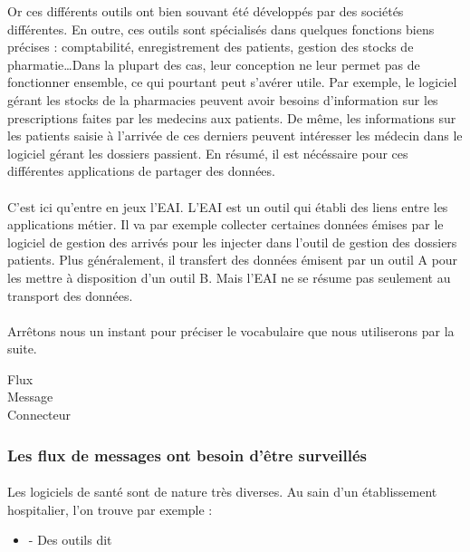 			Or ces différents outils ont bien souvant été développés par des sociétés
			différentes. En outre, ces outils sont spécialisés dans quelques fonctions
			biens précises : comptabilité, enregistrement des patients, gestion des
			stocks de pharmatie\ldots Dans la plupart des cas, leur conception ne leur
			permet pas de fonctionner ensemble, ce qui pourtant peut s'avérer utile. Par
			exemple, le logiciel gérant les stocks de la pharmacies peuvent avoir besoins
			d'information sur les prescriptions faites par les medecins aux patients. De
			même, les informations sur les patients saisie à l'arrivée de ces derniers
			peuvent intéresser les médecin dans le logiciel gérant les dossiers passient.
			En résumé, il est nécéssaire pour ces différentes applications de partager
			des données.
		
			\paragraph{}%
			C'est ici qu'entre en jeux l'EAI. L'EAI est un outil qui établi des liens
			entre les applications métier. Il va par exemple collecter certaines données
			émises par le logiciel de gestion des arrivés pour les injecter dans l'outil
			de gestion des dossiers patients. Plus généralement, il transfert des données
			émisent par un outil A pour les mettre à disposition d'un outil B.\newline
			Mais l'EAI ne se résume pas seulement au transport des données.

			\paragraph{}%
 			Arrêtons nous un instant pour préciser le vocabulaire que nous utiliserons
 			par la suite.\newline
 			\begin{description}
 				\item[Flux]
 				\item[Message]
 				\item[Connecteur]
 			\end{description}
 			
		\subsubsection{Les flux de messages ont besoin d'être surveillés}
			\paragraph{}
			Les logiciels de santé sont de nature très diverses. Au sain d'un
 			établissement hospitalier, l'on trouve par exemple :
 			\begin{itemize}
 			  \item{-} Des outils dit 
 			\end{itemize}
